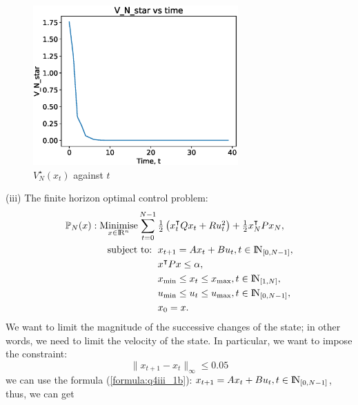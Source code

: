 \documentclass[a4paper,11pt,reqno]{amsart}
\newcommand{\R}{{\rm I\!R}}
\newcommand{\N}{{\rm I\!N}}
\newcommand{\tran}{\intercal}
\DeclareMathOperator*{\minimise}{Minimise}
\begin{document}
\begin{figure}[H]
    \centering
    \includegraphics[width=0.7\textwidth]{figures/q4_ii.eps}
    \caption{$V^{\star}_{N}(x_t)$ against $t$}
    \label{fig:q4_ii}
\end{figure}
(iii)
The finite horizon optimal control problem:
\begin{subequations}
    \begin{align}
        \mathbb{P}_N(x): \minimise_{x\in \R^n}\sum_{t=0}^{N-1}\, 
        & \textstyle\frac{1}{2}\left(x_t^{\tran}Qx_t+Ru^2_t\right)+\frac{1}{2}x_N^{\tran}Px_N,
        \\
        \text{subject to: }\,
        & x_{t+1} = A x_t + B u_t, t\in\N_{[0, N-1]}, \label{formula:q4iii_1b}
        \\
        & x^{\tran}Px\leq \alpha,
        \\
        & x_{\mathrm{min}}\leq x_t\leq x_{\mathrm{max}}, t \in \N_{[1, N]},
        \\
        & u_{\mathrm{min}}\leq u_t\leq u_{\mathrm{max}}, t \in \N_{[0, N-1]},
        \\
        & x_{0} = x.
    \end{align}
\end{subequations}
We want to limit the magnitude of the successive changes of the state; in other
words, we need to limit the velocity of the state. In particular, we want to impose the constraint:
$$\|x_{t+1}-x_t\|_{\infty}\leq 0.05$$
we can use the formula (\ref{formula:q4iii_1b}): $x_{t+1} = A x_t + B u_t, t\in\N_{[0, N-1]}$, thus, we can get
\end{document}
